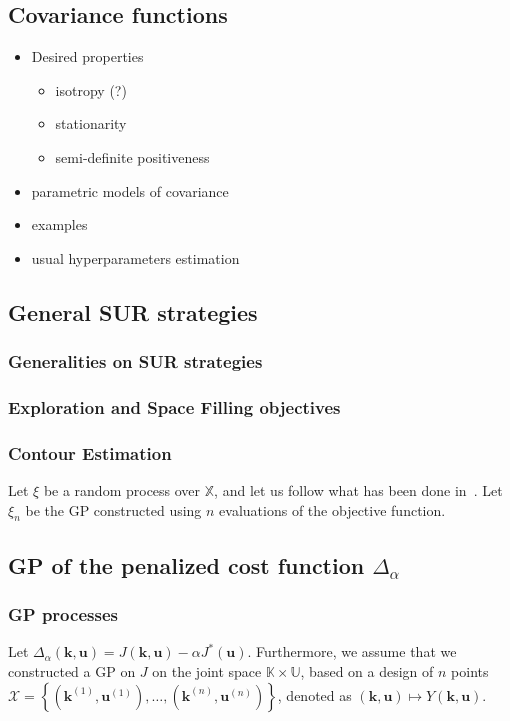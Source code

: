 \documentclass[a4paper,11pt]{article}
\newcommand{\Kspace}{\mathbb{K}}
\newcommand{\Uspace}{\mathbb{U}}
\newcommand{\Xspace}{\mathbb{X}}
\theoremstyle{defi}
\numberwithin{thmCounter}{section}
\begin{document}
\subsection{Covariance functions}
\label{sec:cov_fun}
\begin{itemize}
\item Desired properties
  \begin{itemize}
  \item isotropy (?)
  \item stationarity
  \item semi-definite positiveness
  \end{itemize}
\item parametric models of covariance
\item examples
\item usual hyperparameters estimation
\end{itemize}

\subsection{General SUR strategies}
\label{sec:SUR_strat}
\subsubsection{Generalities on SUR strategies}

\subsubsection{Exploration and Space Filling objectives}

\subsubsection{Contour Estimation}
Let $\xi$ be a random process over $\Xspace$, and let us follow what has been done in~\cite{bect_sequential_2012}.
Let $\xi_n$ be the GP constructed using $n$ evaluations of the objective function.
\subsection{GP of the penalized cost function $\Delta_{\alpha}$}
\subsubsection{GP processes}
Let $\Delta_{\alpha}(\mathbf{k},\mathbf{u}) = J(\mathbf{k},\mathbf{u}) - \alpha J^*(\mathbf{u})$. Furthermore, we assume that we constructed a GP on $J$ on the joint space $\Kspace \times \Uspace$, based on a design of $n$ points $\mathcal{X} = \left\{(\mathbf{k}^{(1)},\mathbf{u}^{(1)}),\dots,(\mathbf{k}^{(n)},\mathbf{u}^{(n)}) \right\}$, denoted as $(\mathbf{k},\mathbf{u})\mapsto Y(\mathbf{k},\mathbf{u})$.
\end{document}
